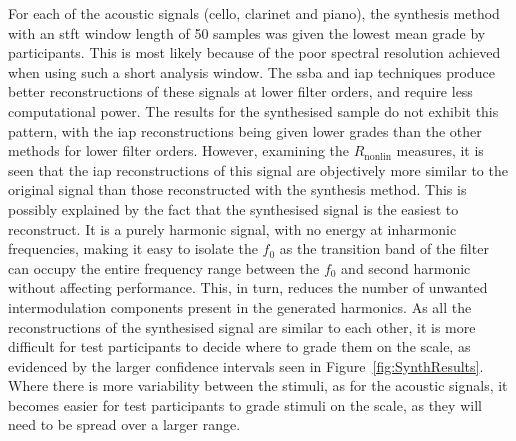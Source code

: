 		For each of the acoustic signals (cello, clarinet and piano), the synthesis method with an \acrshort{stft}
		window length of 50 samples was given the lowest mean grade by participants. This is most likely because of
		the poor spectral resolution achieved when using such a short analysis window. The \acrshort{ssba} and
		\acrshort{iap} techniques produce better reconstructions of these signals at lower filter orders, and
		require less computational power. The results for the synthesised sample do not exhibit this pattern, with
		the \acrshort{iap} reconstructions being given lower grades than the other methods for lower filter orders.
		However, examining the $R_{\mathrm{nonlin}}$ measures, it is seen that the \acrshort{iap} reconstructions
		of this signal are objectively more similar to the original signal than those reconstructed with the
		synthesis method. This is possibly explained by the fact that the synthesised signal is the easiest to
		reconstruct. It is a purely harmonic signal, with no energy at inharmonic frequencies, making it easy to
		isolate the $f_{0}$ as the transition band of the filter can occupy the entire frequency range between the
		$f_{0}$ and second harmonic without affecting performance. This, in turn, reduces the number of unwanted
		intermodulation components present in the generated harmonics. As all the reconstructions of the
		synthesised signal are similar to each other, it is more difficult for test participants to decide where to
		grade them on the scale, as evidenced by the larger confidence intervals seen in
		Figure~\ref{fig:SynthResults}. Where there is more variability between the stimuli, as for the acoustic
		signals, it becomes easier for test participants to grade stimuli on the scale, as they will need to be
		spread over a larger range.

